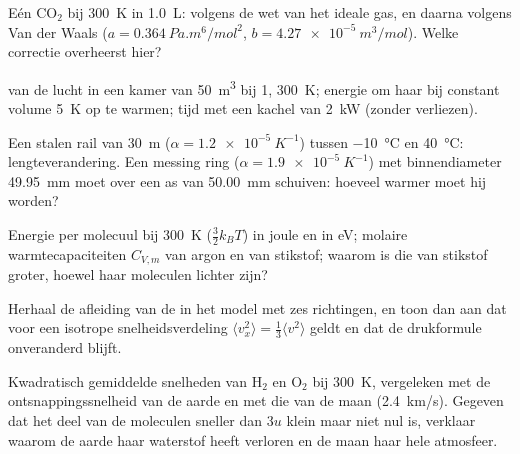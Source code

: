 \begin{exercise}[$\star\star$]\label{exo:b1:kinetic-theory:7}
Eén  CO$_2$ bij \qty{300}{K} in \qty{1.0}{L}:  volgens de wet van het
ideale gas, en daarna volgens Van der Waals ($a = \qty{0.364}{Pa.m^6/mol^2}$,
$b = \qty{4.27e-5}{m^3/mol}$). Welke correctie overheerst hier?
\end{exercise}

\begin{exercise}[$\star\star$]\label{exo:b1:kinetic-theory:8}
 van de lucht in een kamer van \qty{50}{m^3} bij \qty{1}{},
\qty{300}{K}; energie om haar bij constant volume \qty{5}{K} op te warmen; tijd
met een kachel van \qty{2}{kW} (zonder verliezen).
\end{exercise}

\begin{exercise}[$\star\star$]\label{exo:b1:kinetic-theory:9}
Een stalen rail van \qty{30}{m} ($\alpha = \qty{1.2e-5}{K^{-1}}$) tussen
\qty{-10}{\degreeCelsius} en \qty{40}{\degreeCelsius}: lengteverandering.
Een messing ring ($\alpha = \qty{1.9e-5}{K^{-1}}$) met binnendiameter
\qty{49.95}{mm} moet over een as van \qty{50.00}{mm} schuiven: hoeveel warmer
moet hij worden?
\end{exercise}

\begin{exercise}[$\star\star\star$]\label{exo:b1:kinetic-theory:10}
Energie per molecuul bij \qty{300}{K} ($\tfrac32 k_BT$) in joule en in eV;
molaire warmtecapaciteiten $C_{V,m}$ van argon en van stikstof; waarom is die van
stikstof groter, hoewel haar moleculen lichter zijn?
\end{exercise}

\begin{exercise}[$\star\star\star$]\label{exo:b1:kinetic-theory:11}
Herhaal de afleiding van de  in het model met zes richtingen,
en toon dan aan dat voor een isotrope snelheidsverdeling $\langle v_x^2\rangle
= \tfrac13\langle v^2\rangle$ geldt en dat de drukformule onveranderd blijft.
\end{exercise}

\begin{exercise}[$\star\star\star$]\label{exo:b1:kinetic-theory:12}
Kwadratisch gemiddelde snelheden van H$_2$ en O$_2$ bij \qty{300}{K}, vergeleken met
de ontsnappingssnelheid van de aarde en met die van de maan (\qty{2.4}{km/s}).
Gegeven dat het deel van de moleculen sneller dan $3u$ klein maar niet
nul is, verklaar waarom de aarde haar waterstof heeft verloren en de maan haar
hele atmosfeer.
\end{exercise}

